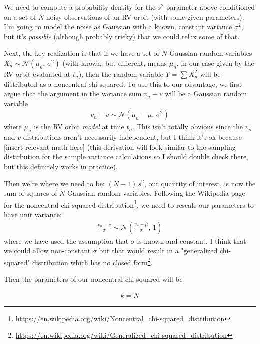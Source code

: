 \documentclass[modern, letterpaper]{aastex63}
\begin{document}
We need to compute a probability density for the $s^2$ parameter above conditioned on a set of $N$ noisy observations of an RV orbit (with some given parameters).
I'm going to model the noise as Gaussian with a known, constant variance $\sigma^2$, but it's \emph{possible} (although probably tricky) that we could relax some of that.

Next, the key realization is that if we have a set of $N$ Gaussian random variables $X_n \sim \mathcal{N}\left(\mu_n,\,\sigma^2\right)$ (with known, but different, means $\mu_n$, in our case given by the RV orbit evaluated at $t_n$), then the random variable $Y = \sum X_n^2$ will be distributed as a noncentral chi-squared.
To use this to our advantage, we first argue that the argument in the variance sum $v_n - \bar{v}$ will be a Gaussian random variable
\begin{eqnarray}
  v_n - \bar{v} \sim \mathcal{N}\left(\mu_n - \bar{\mu},\,\sigma^2\right)
\end{eqnarray}
where $\mu_n$ is the RV orbit \emph{model} at time $t_n$.
This isn't totally obvious since the $v_n$ and $\bar{v}$ distributions aren't necessarily independent, but I think it's ok because [insert relevant math here] (this derivation will look similar to the sampling distirbution for the sample variance calculations so I should double check there, but this definitely works in practice).

Then we're where we need to be: $(N - 1)\,s^2$, our quantity of interest, is now the sum of squares of $N$ Gaussian random variables.
Following the Wikipedia page for the noncentral chi-squared distribution\footnote{\url{https://en.wikipedia.org/wiki/Noncentral_chi-squared_distribution}}, we need to rescale our parameters to have unit variance:
\begin{eqnarray}
  \frac{v_n - \bar{v}}{\sigma} \sim \mathcal{N}\left(\frac{v_n - \bar{\mu}}{\sigma},\,1\right)
\end{eqnarray}
where we have used the assumption that $\sigma$ is known and constant.
I think that we could allow non-constant $\sigma$ but that would result in a "generalized chi-squared" distribution which has no closed form\footnote{\url{https://en.wikipedia.org/wiki/Generalized_chi-squared_distribution}}.

Then the parameters of our noncentral chi-squared will be

\begin{eqnarray}
  k = N
\end{eqnarray}
\end{document}
